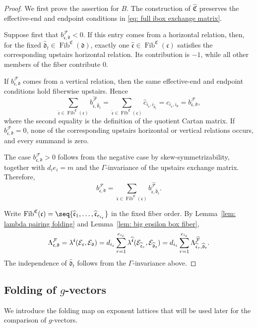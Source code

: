 \documentclass[12pt, leqno]{amsart}
\numberwithin{equation}{section}
\theoremstyle{plain}
\theoremstyle{definition}
\newcommand{\ii}{ \textbf{\textit{i}}}
\newcommand{\Fib}{\operatorname{Fib}}
\newcommand{\hc}{\widehat{c}}
\newcommand{\hii}{{\widehat{\ii}}}
\newcommand{\frakC}{\mathfrak{C}}
\newcommand{\frakc}{\mathfrak{c}}
\newcommand{\frakd}{\mathfrak{d}}
\newcommand{\hfrakC}{\widehat{\frakC}}
\newcommand{\hfrakc}{\widehat{\frakc}}
\newcommand{\hfrakd}{\widehat{\frakd}}
\newcommand{\calE}{\mathcal{E}}
\newcommand{\calF}{\mathcal{F}}
\newcommand{\hcalF}{{\widehat{\calF}}}
\begin{document}
\begin{proof}
We first prove the assertion for $B$.  The construction of $\hfrakC$ preserves the effective-end and endpoint conditions
in \eqref{eq: full ibox exchange matrix}.

Suppose first that $b^\calF_{\frakc,\frakd}<0$. If this entry comes
from a horizontal relation, then, for the fixed
$\hfrakd_t\in\Fib^{\frakC}(\frakd)$, exactly one
$\hfrakc\in\Fib^{\frakC}(\frakc)$ satisfies the corresponding
upstairs horizontal relation. Its contribution is $-1$, while all
other members of the fiber contribute $0$.

If $b^\calF_{\frakc,\frakd}$ comes from a vertical relation, then the
same effective-end and endpoint conditions hold fiberwise upstairs.
Hence
\[
\sum_{\hfrakc\in\Fib^{\frakC}(\frakc)} b^{\hcalF}_{\hfrakc,\hfrakd_t}
= \sum_{\hfrakc\in\Fib^{\frakC}(\frakc)} \hc_{i_{\hfrakc},i_{\hfrakd_t}}
= c_{i_{\frakc},i_{\frakd}} = b^\calF_{\frakc,\frakd},
\]
where the second equality is the definition of the quotient Cartan
matrix. If $b^\calF_{\frakc,\frakd}=0$, none of the corresponding
upstairs horizontal or vertical relations occurs, and every summand
is zero.

The case $b^\calF_{\frakc,\frakd}>0$ follows from the negative case
by skew-symmetrizability, together with $d_i e_i=m$ and the
$\Gamma$-invariance of the upstairs exchange matrix. Therefore,
\[
b^\calF_{\frakc,\frakd} = \sum_{\hfrakc\in\Fib^{\frakC}(\frakc)} b^{\hcalF}_{\hfrakc,\hfrakd_t}.
\]

Write
$\Fib^{\frakC}(\frakc) = \seq{\hfrakc_1,\ldots,\hfrakc_{e_{i_\frakc}}}$
in the fixed fiber order. By Lemma~\ref{lem: lambda pairing folding} and Lemma~\ref{lem: big epsilon box fiber},
\begin{align*}
\Lambda^\calF_{\frakc,\frakd} = \lambda^\ii(\calE_\frakc,\calE_\frakd)
= d_{i_\frakc} \sum_{r=1}^{e_{i_\frakc}}  \lambda^\hii(\calE_{\hfrakc_r},\calE_{\hfrakd_t}) =
d_{i_\frakc} \sum_{r=1}^{e_{i_\frakc}} \Lambda^{\hcalF}_{\hfrakc_r,\hfrakd_t}.
\end{align*}
The independence of $\hfrakd_t$ follows from the $\Gamma$-invariance above.
\end{proof}

\subsection{Folding of $g$-vectors}

We introduce the folding map on exponent lattices that will be used
later for the comparison of $g$-vectors.
\end{document}
